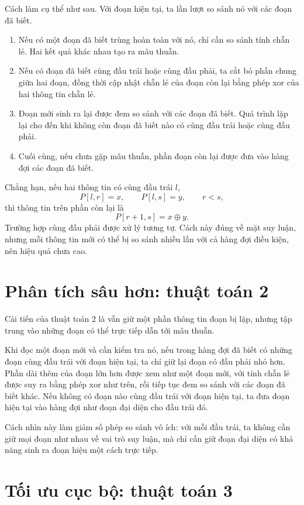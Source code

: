\documentclass[11pt]{article}
\begin{document}
Cách làm cụ thể như sau. Với đoạn hiện tại, ta lần lượt so sánh nó với các
đoạn đã biết.

\begin{enumerate}
  \item Nếu có một đoạn đã biết trùng hoàn toàn với nó, chỉ cần so sánh tính
  chẵn lẻ. Hai kết quả khác nhau tạo ra mâu thuẫn.
  \item Nếu có đoạn đã biết cùng đầu trái hoặc cùng đầu phải, ta cắt bỏ phần
  chung giữa hai đoạn, đồng thời cập nhật chẵn lẻ của đoạn còn lại bằng phép
  xor của hai thông tin chẵn lẻ.
  \item Đoạn mới sinh ra lại được đem so sánh với các đoạn đã biết. Quá trình
  lặp lại cho đến khi không còn đoạn đã biết nào có cùng đầu trái hoặc cùng
  đầu phải.
  \item Cuối cùng, nếu chưa gặp mâu thuẫn, phần đoạn còn lại được đưa vào
  hàng đợi các đoạn đã biết.
\end{enumerate}

Chẳng hạn, nếu hai thông tin có cùng đầu trái \(l\),
\[
  P[l,r]=x,\qquad P[l,s]=y,\qquad r<s,
\]
thì thông tin trên phần còn lại là
\[
  P[r+1,s]=x\oplus y.
\]
Trường hợp cùng đầu phải được xử lý tương tự. Cách này đúng về mặt suy luận,
nhưng mỗi thông tin mới có thể bị so sánh nhiều lần với cả hàng đợi điều kiện,
nên hiệu quả chưa cao.

\section{Phân tích sâu hơn: thuật toán 2}

Cải tiến của thuật toán 2 là vẫn giữ một phần thông tin đoạn bị lặp, nhưng
tập trung vào những đoạn có thể trực tiếp dẫn tới mâu thuẫn.

Khi đọc một đoạn mới và cần kiểm tra nó, nếu trong hàng đợi đã biết có những
đoạn cùng đầu trái với đoạn hiện tại, ta chỉ giữ lại đoạn có đầu phải nhỏ hơn.
Phần dài thêm của đoạn lớn hơn được xem như một đoạn mới, với tính chẵn lẻ
được suy ra bằng phép xor như trên, rồi tiếp tục đem so sánh với các đoạn đã
biết khác. Nếu không có đoạn nào cùng đầu trái với đoạn hiện tại, ta đưa đoạn
hiện tại vào hàng đợi như đoạn đại diện cho đầu trái đó.

Cách nhìn này làm giảm số phép so sánh vô ích: với mỗi đầu trái, ta không cần
giữ mọi đoạn như nhau về vai trò suy luận, mà chỉ cần giữ đoạn đại diện có khả
năng sinh ra đoạn hiệu một cách trực tiếp.

\section{Tối ưu cục bộ: thuật toán 3}
\end{document}
